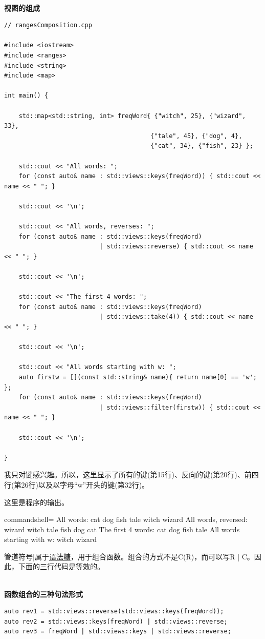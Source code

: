 \hspace*{\fill} \\ %
\noindent
\textbf{视图的组成}
\begin{lstlisting}[style=styleCXX]
// rangesComposition.cpp

#include <iostream>
#include <ranges>
#include <string>
#include <map>

int main() {
	
	std::map<std::string, int> freqWord{ {"witch", 25}, {"wizard", 33},
										{"tale", 45}, {"dog", 4},
										{"cat", 34}, {"fish", 23} };
	
	std::cout << "All words: ";
	for (const auto& name : std::views::keys(freqWord)) { std::cout << name << " "; }
	
	std::cout << '\n';
	
	std::cout << "All words, reverses: ";
	for (const auto& name : std::views::keys(freqWord)
	                      | std::views::reverse) { std::cout << name << " "; }
	
	std::cout << '\n';
	
	std::cout << "The first 4 words: ";
	for (const auto& name : std::views::keys(freqWord)
	                      | std::views::take(4)) { std::cout << name << " "; }
	
	std::cout << '\n';
	
	std::cout << "All words starting with w: ";
	auto firstw = [](const std::string& name){ return name[0] == 'w'; };
	for (const auto& name : std::views::keys(freqWord)
	                      | std::views::filter(firstw)) { std::cout << name << " "; }
	
	std::cout << '\n';

}
\end{lstlisting}

我只对键感兴趣。所以，这里显示了所有的键(第15行)、反向的键(第20行)、前四行(第26行)以及以字母“w”开头的键(第32行)。

这里是程序的输出。

\begin{tcblisting}{commandshell={}}
All words: cat dog fish tale witch wizard
All words, reversed: wizard witch tale fish dog cat
The first 4 words: cat dog fish tale
All words starting with w: witch wizard
\end{tcblisting}

管道符号|属于\href{https://en.wikipedia.org/wiki/Syntactic_sugar}{语法糖}，用于组合函数。组合的方式不是C(R)，而可以写R | C。因此，下面的三行代码是等效的。

\hspace*{\fill} \\ %
\noindent
\textbf{函数组合的三种句法形式}
\begin{lstlisting}[style=styleCXX]
auto rev1 = std::views::reverse(std::views::keys(freqWord));
auto rev2 = std::views::keys(freqWord) | std::views::reverse;
auto rev3 = freqWord | std::views::keys | std::views::reverse;
\end{lstlisting}

